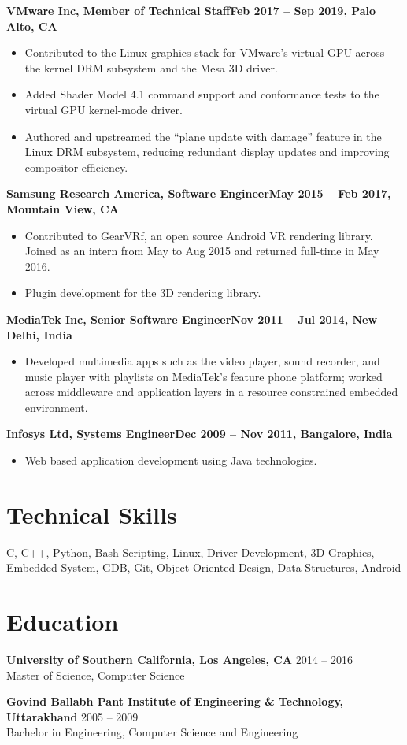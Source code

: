 \documentclass[11pt]{article}
\newcommand{\jobentry}[2]{%
  \noindent\textbf{#1}\hfill\textbf{#2}\par\vspace{-6pt}}
\begin{document}
\jobentry{VMware Inc, Member of Technical Staff}{Feb 2017 -- Sep 2019, Palo Alto, CA}
\begin{itemize}
    \item Contributed to the Linux graphics stack for VMware's virtual GPU across the kernel DRM subsystem and the Mesa 3D driver.
    \item Added Shader Model 4.1 command support and conformance tests to the virtual GPU kernel-mode driver.
    \item Authored and upstreamed the ``plane update with damage'' feature in the Linux DRM subsystem, reducing redundant display updates and improving compositor efficiency.
\end{itemize}

\jobentry{Samsung Research America, Software Engineer}{May 2015 -- Feb 2017, Mountain View, CA}
\begin{itemize}
    \item Contributed to GearVRf, an open source Android VR rendering library. Joined as an intern from May to Aug 2015 and returned full-time in May 2016.
    \item Plugin development for the 3D rendering library.
\end{itemize}

\jobentry{MediaTek Inc, Senior Software Engineer}{Nov 2011 -- Jul 2014, New Delhi, India}
\begin{itemize}
    \item Developed multimedia apps such as the video player, sound recorder, and music player with playlists on MediaTek's feature phone platform; worked across middleware and application layers in a resource constrained embedded environment.
\end{itemize}

\jobentry{Infosys Ltd, Systems Engineer}{Dec 2009 -- Nov 2011, Bangalore, India}
\begin{itemize}
    \item Web based application development using Java technologies.
\end{itemize}

\section*{Technical Skills}
C, C++, Python, Bash Scripting, Linux, Driver Development, 3D Graphics, Embedded System, GDB, Git, Object Oriented Design, Data Structures, Android

\section*{Education}

\noindent\textbf{University of Southern California, Los Angeles, CA} \hfill 2014 -- 2016 \\
Master of Science, Computer Science

\vspace{4pt}

\noindent\textbf{Govind Ballabh Pant Institute of Engineering \& Technology, Uttarakhand} \hfill 2005 -- 2009 \\
Bachelor in Engineering, Computer Science and Engineering
\end{document}
